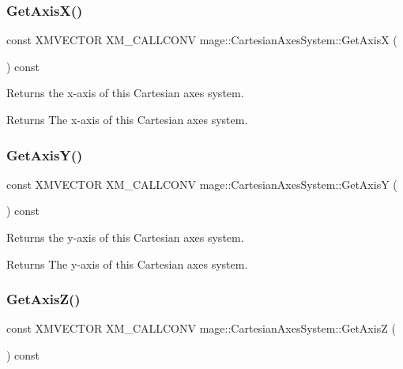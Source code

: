 \subsubsection{\texorpdfstring{Get\+Axis\+X()}{GetAxisX()}}
{\footnotesize\ttfamily const X\+M\+V\+E\+C\+T\+OR X\+M\+\_\+\+C\+A\+L\+L\+C\+O\+NV mage\+::\+Cartesian\+Axes\+System\+::\+Get\+AxisX (\begin{DoxyParamCaption}{ }\end{DoxyParamCaption}) const\hspace{0.3cm}{\ttfamily [noexcept]}}

Returns the x-\/axis of this Cartesian axes system.

\begin{DoxyReturn}{Returns}
The x-\/axis of this Cartesian axes system. 
\end{DoxyReturn}
\hypertarget{structmage_1_1_cartesian_axes_system_a690afbdf71c3052cc6da11b6c841702b}{}\label{structmage_1_1_cartesian_axes_system_a690afbdf71c3052cc6da11b6c841702b} 
\subsubsection{\texorpdfstring{Get\+Axis\+Y()}{GetAxisY()}}
{\footnotesize\ttfamily const X\+M\+V\+E\+C\+T\+OR X\+M\+\_\+\+C\+A\+L\+L\+C\+O\+NV mage\+::\+Cartesian\+Axes\+System\+::\+Get\+AxisY (\begin{DoxyParamCaption}{ }\end{DoxyParamCaption}) const\hspace{0.3cm}{\ttfamily [noexcept]}}

Returns the y-\/axis of this Cartesian axes system.

\begin{DoxyReturn}{Returns}
The y-\/axis of this Cartesian axes system. 
\end{DoxyReturn}
\hypertarget{structmage_1_1_cartesian_axes_system_a13567d3342de7609c0bdf18e8596b96f}{}\label{structmage_1_1_cartesian_axes_system_a13567d3342de7609c0bdf18e8596b96f} 
\subsubsection{\texorpdfstring{Get\+Axis\+Z()}{GetAxisZ()}}
{\footnotesize\ttfamily const X\+M\+V\+E\+C\+T\+OR X\+M\+\_\+\+C\+A\+L\+L\+C\+O\+NV mage\+::\+Cartesian\+Axes\+System\+::\+Get\+AxisZ (\begin{DoxyParamCaption}{ }\end{DoxyParamCaption}) const\hspace{0.3cm}{\ttfamily [noexcept]}}

